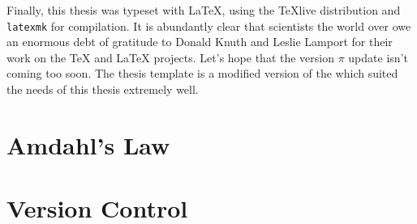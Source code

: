 Finally, this thesis was typeset with \LaTeX{}, using the {\TeX}live distribution and \texttt{latexmk} for compilation.
It is abundantly clear that scientists the world over owe an enormous debt of gratitude to Donald Knuth and Leslie Lamport for their work on the \TeX{} and \LaTeX{} projects.
Let's hope that the version $\pi$ update isn't coming too soon.
The thesis template is a modified version of the  which suited the needs of this thesis extremely well.

\section{Amdahl's Law}

\section{Version Control}